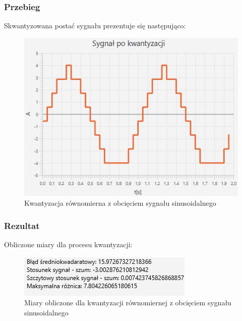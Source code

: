 \documentclass[12pt]{article}
\begin{document}
\subsubsection{Przebieg}
Skwantyzowana postać sygnału prezentuje się następująco:
\begin{figure}[H]
    \centering
	\includegraphics[width=\linewidth]{kwantyzacja_z_obcieciem.jpg}
    \caption{Kwantyzacja równomierna z obcięciem sygnału sinusoidalnego}
    \label{wykres dla eksperymentu 1.1}
\end{figure}

\subsubsection{Rezultat}
Obliczone miary dla procesu kwantyzacji:
\begin{figure}[H]
    \centering
	\includegraphics[width=\linewidth]{wyniki_kwantyzacja_z_obcieciem.jpg}
    \caption{Miary obliczone dla kwantyzacji równomiernej z obcięciem sygnału sinusoidalnego}
    \label{Wartości dla eksperymentu 1}
\end{figure}


\end{document}
